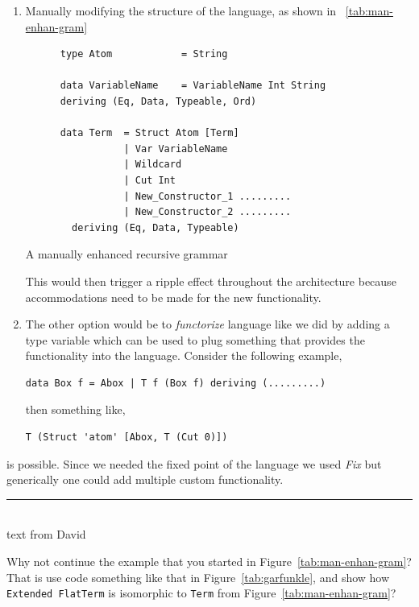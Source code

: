 \documentclass[thesis-solanki.tex]{subfiles}
\begin{document}
\begin{enumerate}
\item Manually modifying the structure of the language, as shown in ~\ref{tab:man-enhan-gram}
  \begin{code-list}
    \begin{verbatim}
      type Atom            = String

      data VariableName    = VariableName Int String
      deriving (Eq, Data, Typeable, Ord)

      data Term  = Struct Atom [Term]
                 | Var VariableName
                 | Wildcard
                 | Cut Int
                 | New_Constructor_1 .........
                 | New_Constructor_2 .........
        deriving (Eq, Data, Typeable)
    \end{verbatim}
    \caption{A manually enhanced recursive grammar}
    \label{tab:man-enhan-gram}
  \end{code-list}

This would then trigger a ripple effect throughout the architecture because accommodations need to be made for the new functionality.

\item The other option would be to \textit{functorize} language like we did by adding a type variable which can be used to plug something that provides the functionality into the language.
Consider the following example,

\begin{verbatim}
data Box f = Abox | T f (Box f) deriving (.........)
\end{verbatim}

then something like,
\begin{verbatim}
T (Struct 'atom' [Abox, T (Cut 0)])
\end{verbatim}
\end{enumerate}
is possible. Since we needed the fixed point of the language we used \textit{Fix} but generically one could add multiple custom
functionality.

\begin{center}
  \textcolor{blue}{\rule{0.95\textwidth}{0.2em}}\\[-1ex]
  text from David
\end{center}
Why not continue the example that you started in Figure~\ref{tab:man-enhan-gram}?
That is use code something like that in Figure~\ref{tab:garfunkle}, and show how
\Verb!Extended FlatTerm! is isomorphic to \Verb!Term! from Figure~\ref{tab:man-enhan-gram}?
\end{document}
